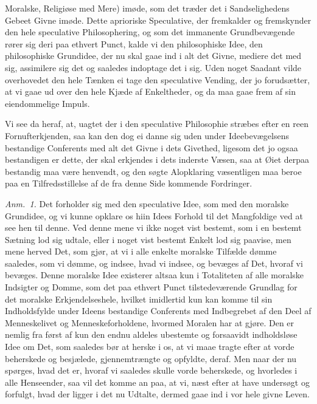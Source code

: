 \documentclass[12pt,a4paper]{book}
\begin{document}
Moralske, Religiøse med Mere) imøde, som det træder det i Sandselighedens Gebeet
Givne imøde. Dette aprioriske Speculative, der fremkalder og fremskynder den hele
speculative Philosophering, og som det immanente Grundbevægende rører sig deri paa
ethvert Punct, kalde vi den philosophiske Idee, den philosophiske Grundidee, der nu
skal gaae ind i alt det Givne, mediere det med sig, assimilere sig det og saaledes
indoptage det i sig. Uden noget Saadant vilde overhovedet den hele Tænken ei tage
den speculative Vending, der jo forudsætter, at vi gaae ud over den hele Kjæde af
Enkeltheder, og da maa gaae frem af sin eiendommelige Impuls.

Vi see da heraf, at, uagtet der i den speculative Philosophie stræbes efter en reen
Fornufterkjenden, saa kan den dog ei danne sig uden under Ideebevægelsens bestandige
Conferents med alt det Givne i dets Givethed, ligesom det jo ogsaa bestandigen er
dette, der skal erkjendes i dets inderste Væsen, saa at Øiet derpaa bestandig maa
være henvendt, og den søgte Alopklaring væsentligen maa beroe paa en
Tilfredsstillelse af de fra denne Side kommende Fordringer.

{\small\emph{Anm.~1.} Det forholder sig med den speculative Idee, som med den
moralske Grundidee, og vi kunne opklare os hiin Idees Forhold til det Mangfoldige
ved at see hen til denne. Ved denne mene vi ikke noget vist bestemt, som i en
bestemt Sætning lod sig udtale, eller i noget vist bestemt Enkelt lod sig paavise,
men mene herved Det, som gjør, at vi i alle enkelte moralske Tilfælde dømme
saaledes, som vi dømme, og indsee, hvad vi indsee, og bevæges af Det, hvoraf vi
bevæges. Denne moralske Idee existerer altsaa kun i Totaliteten af alle moralske
Indsigter og Domme, som det paa ethvert Punct tilstedeværende Grundlag for det
moralske Erkjendelseshele, hvilket imidlertid kun kan komme til sin Indholdsfylde
under Ideens bestandige Conferents med Indbegrebet af den Deel af Menneskelivet og
Menneskeforholdene, hvormed Moralen har at gjøre. Den er nemlig fra først af kun den
endnu aldeles ubestemte og forsaavidt indholdsløse Idee om Det, som saaledes bør at
herske i os, at vi maae tragte efter at vorde beherskede og besjælede,
gjennemtrængte og opfyldte, deraf. Men naar der nu spørges, hvad det er, hvoraf vi
saaledes skulle vorde beherskede, og hvorledes i alle Henseender, saa vil det komme
an paa, at vi, næst efter at have undersøgt og forfulgt, hvad der ligger i det nu
Udtalte, dermed gaae ind i vor hele givne Leven.\par}
\end{document}
